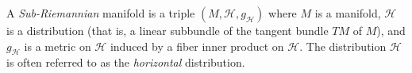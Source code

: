 \documentclass[12pt]{article}
\begin{document}
A \emph{Sub-Riemannian} manifold is a triple $(M,\mathcal{H},g_{\mathcal{H}})$ where $M$ is a manifold,
$\mathcal{H}$ is a distribution (that is, a linear subbundle of the tangent bundle $TM$ of $M$), and
$g_{\mathcal{H}}$ is a metric on $\mathcal{H}$ induced by a fiber inner product on $\mathcal{H}$. The
distribution $\mathcal{H}$ is often referred to as the \emph{horizontal} distribution.
\end{document}
